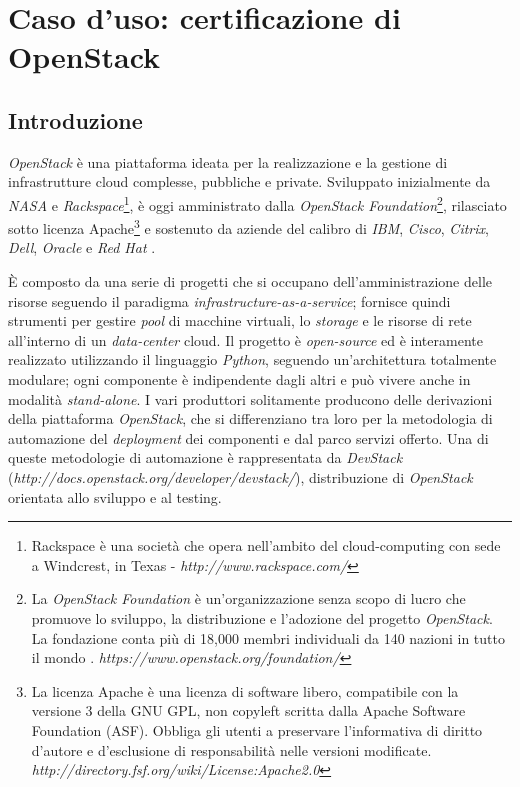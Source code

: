 \documentclass[../main.tex]{subfiles}
\begin{document}
\chapter{Caso d'uso: certificazione di OpenStack}
\section{Introduzione}
\textit{OpenStack} è una piattaforma ideata per la realizzazione e la gestione di infrastrutture cloud complesse, pubbliche e private.
Sviluppato inizialmente da \textit{NASA} e \textit{Rackspace}\footnote{Rackspace è una società che opera nell'ambito del cloud-computing con sede a Windcrest, in Texas - \textit{http://www.rackspace.com/}}, è oggi amministrato dalla \textit{OpenStack Foundation}\footnote{La \textit{OpenStack Foundation} è un'organizzazione senza scopo di lucro che promuove lo sviluppo, la distribuzione e l'adozione del progetto \textit{OpenStack}. La fondazione conta più di 18,000 membri individuali da 140 nazioni in tutto il mondo \cite{OpenstackFoundation}. \textit{https://www.openstack.org/foundation/} }, rilasciato sotto licenza Apache\footnote{La licenza Apache è una licenza di software libero, compatibile con la versione 3 della GNU GPL, non copyleft scritta dalla Apache Software Foundation (ASF). Obbliga gli utenti a preservare l'informativa di diritto d'autore e d'esclusione di responsabilità nelle versioni modificate. \textit{http://directory.fsf.org/wiki/License:Apache2.0}} e sostenuto da aziende del calibro di \textit{IBM}, \textit{Cisco}, \textit{Citrix}, \textit{Dell}, \textit{Oracle} e \textit{Red Hat} \cite{OpenstackWhatIs}.

\`E composto da una serie di progetti che si occupano dell'amministrazione delle risorse seguendo il paradigma \textit{infrastructure-as-a-service}; fornisce quindi strumenti per gestire \textit{pool} di macchine virtuali, lo \textit{storage} e le risorse di rete all'interno di un \textit{data-center} cloud.
Il progetto è \textit{open-source} ed è interamente realizzato utilizzando il linguaggio \textit{Python}, seguendo un'architettura totalmente modulare; ogni componente è indipendente dagli altri e può vivere anche in modalità \textit{stand-alone}.
I vari produttori solitamente producono delle derivazioni della piattaforma \textit{OpenStack}, che si differenziano tra loro per la metodologia di automazione del \textit{deployment} dei componenti e dal parco servizi offerto. Una di queste metodologie di automazione è rappresentata da \textit{DevStack} (\textit{http://docs.openstack.org/developer/devstack/}), distribuzione di \textit{OpenStack} orientata allo sviluppo e al testing.
\end{document}
